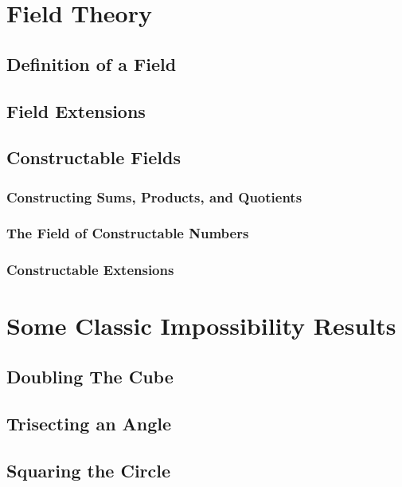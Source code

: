 \documentclass[11pt,a4paper]{article}
\theoremstyle{theorem}
\theoremstyle{definition}
\theoremstyle{definition}
\theoremstyle{remark}
\theoremstyle{definition}
\theoremstyle{remark}
\begin{document}
\section{Field Theory}

\subsection{Definition of a Field}

\subsection{Field Extensions}

\subsection{Constructable Fields}

\subsubsection{Constructing Sums, Products, and Quotients}

\subsubsection{The Field of Constructable Numbers}

\subsubsection{Constructable Extensions}

\section{Some Classic Impossibility Results}

\subsection{Doubling The Cube}

\subsection{Trisecting an Angle}

\subsection{Squaring the Circle}
\end{document}
